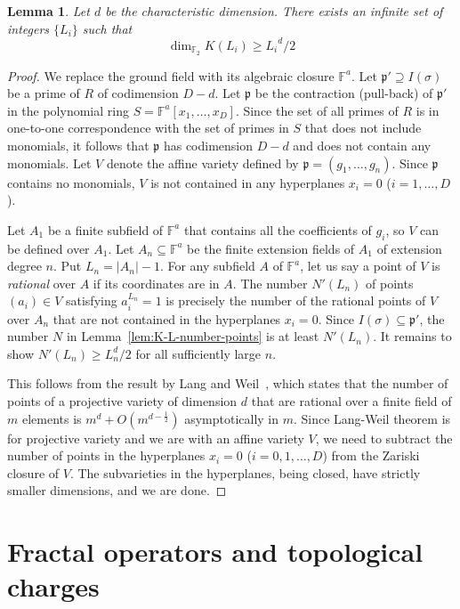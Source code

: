 \documentclass[letterpaper,12pt]{amsart}
\newtheorem{lem}{Lemma}[section]
\theoremstyle{definition} \newtheorem{defn}{Definition}
\theoremstyle{definition} \newtheorem{rem}{Remark}
\theoremstyle{definition} \newtheorem{example}{Example}
\newcommand{\FF}{\mathbb{F}}
\newcommand{\pp}{\mathfrak{p}}
\begin{document}
\begin{lem}
Let $d$ be the characteristic dimension.
There exists an infinite set of integers $\{ L_i \}$ such that
\[
 \dim_{\FF_2} K(L_i) \ge {L_i}^d /2
\]
\label{lem:k-growing-sequence-L}
\end{lem}
\begin{proof}
We replace the ground field with its algebraic closure $\FF^a$.
Let $\pp' \supseteq I(\sigma)$ be a prime of $R$ of codimension $D-d$.
Let $\pp$ be the contraction (pull-back) of $\pp'$ in the polynomial ring
$S = \FF^a[x_1,\ldots,x_D]$. Since the set of all primes of $R$ is in one-to-one
correspondence with the set of primes in $S$ that does not include monomials,
it follows that $\pp$ has codimension $D-d$ and does not contain any monomials.
Let $V$ denote the affine variety defined by $\pp=(g_1,\ldots,g_n)$.
Since $\pp$ contains no monomials, $V$ is not contained in any hyperplanes $x_i = 0$
($i = 1,\ldots, D$).

Let $A_1$ be a finite subfield of $\FF^a$ that contains all the coefficients of $g_i$,
so $V$ can be defined over $A_1$.
Let $A_n \subseteq \FF^a$ be the finite extension fields of $A_1$ of extension degree $n$.
Put $L_n = |A_n|-1$.
For any subfield $A$ of $\FF^a$, let us say a point of $V$ is \emph{rational} over $A$
if its coordinates are in $A$.
The number $N'(L_n)$ of points $(a_i) \in V$ satisfying $a_i^{L_n} = 1$
is precisely the number of the rational points of $V$ over $A_n$
that are not contained in the hyperplanes $x_i=0$.
Since $I(\sigma) \subseteq \pp'$,
the number $N$ in Lemma~\ref{lem:K-L-number-points} is at least $N'(L_n)$.
It remains to show $N'(L_n) \ge L_n^d /2$ for all sufficiently large $n$.

This follows from the result by Lang and Weil~\cite{LangWeil1954},
which states that the number of points of a projective variety
of dimension $d$ that are rational over a finite field of $m$ elements
is $m^d + O\left(m^{d-\frac{1}{2}} \right)$ asymptotically in $m$.
Since Lang-Weil theorem is for projective variety
and we are with an affine variety $V$,
we need to subtract the number of points in the hyperplanes $x_i = 0$
($i = 0,1,\ldots,D$)
from the Zariski closure of $V$.
The subvarieties in the hyperplanes, being closed,
have strictly smaller dimensions, and we are done.
\end{proof}


\section{Fractal operators and topological charges}
\end{document}
